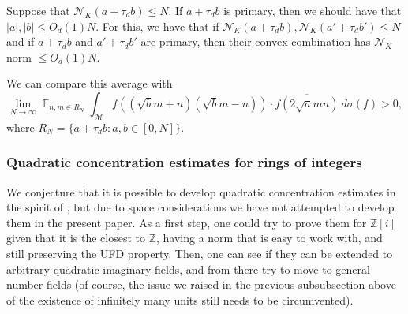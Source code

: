 \documentclass[11pt]{amsart}
\theoremstyle{definition}
\DeclareMathOperator*{\E}{\mathbb{E}}
\newcommand{\NN}{{\mathcal N}}
\newcommand{\Z}{{\mathbb Z}}
\begin{document}
{{\color{red}

Suppose that $\NN_{K}(a+\tau_{d}b)\leq N$. If $a+\tau_{d}b$ is primary, then we should have that $\vert a\vert, \vert b\vert\leq O_{d}(1)N$. For this, we have that if $\NN_{K}(a+\tau_{d}b), \NN_{K}(a'+\tau_{d}b')\leq N$ and if $a+\tau_{d}b$ and $a'+\tau_{d}b'$ are primary, then their convex combination has $\NN_{K}$ norm $\leq O_{d}(1)N$.

}

We can compare this average with 
\begin{equation}\nonumber
    \lim_{N \to \infty} \E_{n,m \in R_{N}}\int_{\mathcal{M}} f((\sqrt{b}m+n)(\sqrt{b}m-n)) \cdot \overline{f(2\sqrt{a}mn)} \ d\sigma(f)>0,
\end{equation}
where $R_{N}=\{a+\tau_{d}b\colon a,b\in [0,N]\}$.}
\fi
\subsubsection{Quadratic concentration estimates for rings of integers}
We conjecture that it is possible to develop quadratic concentration estimates in the spirit of \cite{FKM2}, but due to space considerations we have not attempted to develop them in the present paper. As a first step, one could try to prove them for $\Z[i]$ given that it is the closest to $\Z$, having a norm that is easy to work with, and still preserving the UFD property. Then, one can see if they can be extended to arbitrary quadratic imaginary fields, and from there try to move to general number fields (of course, the issue we raised in the previous subsubsection above of the existence of infinitely many units still needs to be circumvented).
\end{document}
